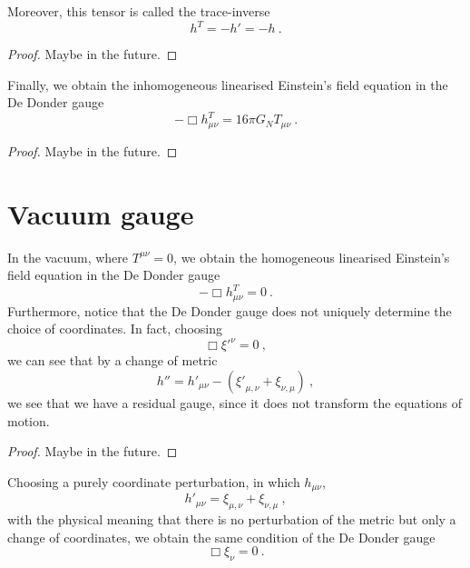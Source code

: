     Moreover, this tensor is called the trace-inverse 
    \begin{equation*}
        h^T = - h' = - h ~.
    \end{equation*}
    \begin{proof}
        Maybe in the future.
    \end{proof}

    Finally, we obtain the inhomogeneous linearised Einstein's field equation in the De Donder gauge
    \begin{equation*}
        - \Box h^T_{\mu\nu} = 16 \pi G_N T_{\mu\nu} ~.
    \end{equation*}
    \begin{proof}
        Maybe in the future.
    \end{proof}

\section{Vacuum gauge}

    In the vacuum, where $T^{\mu\nu} = 0$, we obtain the homogeneous linearised Einstein's field equation in the De Donder gauge
    \begin{equation*}
        - \Box h^T_{\mu\nu} = 0 ~.
    \end{equation*}
    Furthermore, notice that the De Donder gauge does not uniquely determine the choice of coordinates. In fact, choosing 
    \begin{equation*}
        \Box {\xi'}^\nu = 0 ~,
    \end{equation*}
    we can see that by a change of metric 
    \begin{equation*}
        {h''} = {h'}_{\mu\nu} - ({\xi'}_{\mu,\nu} + {\xi}_{\nu,\mu}) ~,
    \end{equation*}
    we see that we have a residual gauge, since it does not transform the equations of motion.
    \begin{proof}
        Maybe in the future.
    \end{proof}

    Choosing a purely coordinate perturbation, in which $h_{\mu\nu}$,
    \begin{equation*}
        {h'}_{\mu\nu} = \xi_{\mu,\nu} + \xi_{\nu,\mu} ~,
    \end{equation*}
    with the physical meaning that there is no perturbation of the metric but only a change of coordinates, we obtain the same condition of the De Donder gauge 
    \begin{equation*}
        \Box \xi_\nu = 0~.
    \end{equation*} 